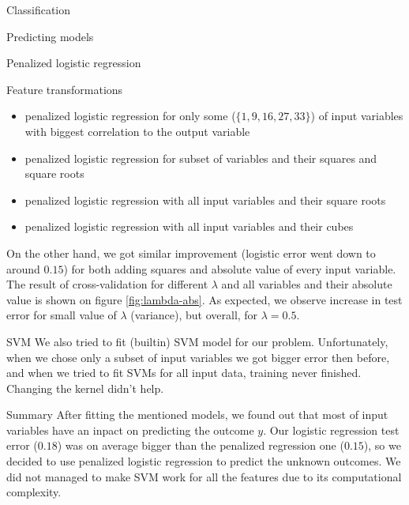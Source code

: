 \documentclass{article}
\begin{document}
\begin{section}{Classification}
\begin{subsection}{Predicting models}
\begin{subsubsection}{Penalized logistic regression}
\begin{subsubsection}{Feature transformations}
\begin{itemize}
\item penalized logistic regression for only some ($\{1, 9, 16, 27, 33\}$) of input variables with biggest correlation to the output variable
\item penalized logistic regression for subset of variables and their squares and square roots
\item penalized logistic regression with all input variables and their square roots
\item penalized logistic regression with all input variables and their cubes

\end{itemize}

On the other hand, we got similar improvement (logistic error went down to around $0.15$) for both adding squares and absolute value of every input variable. The result of cross-validation for different $\lambda$ and all variables and their absolute value is shown on figure \ref{fig:lambda-abs}. As expected, we observe increase in test error for small value of $\lambda$ (variance), but overall, for $\lambda = 0.5$.
\end{subsubsection}
\end{subsubsection}
\begin{subsubsection}{SVM}
We also tried to fit (builtin) SVM model for our problem. Unfortunately, when we chose only a subset of input variables we got bigger error then before, and when we tried to fit SVMs for all input data, training never finished. Changing the kernel didn't help.
\end{subsubsection}
\end{subsection}
\begin{subsection}{Summary}
After fitting the mentioned models, we found out that most of input variables have an inpact on predicting the outcome $y$. Our logistic regression test error ($0.18$) was on average bigger than the penalized regression one ($0.15$), so we decided to use penalized logistic regression to predict the unknown outcomes. We did not managed to make SVM work for all the features due to its computational complexity.
\end{subsection}
\end{section}
\end{document}
